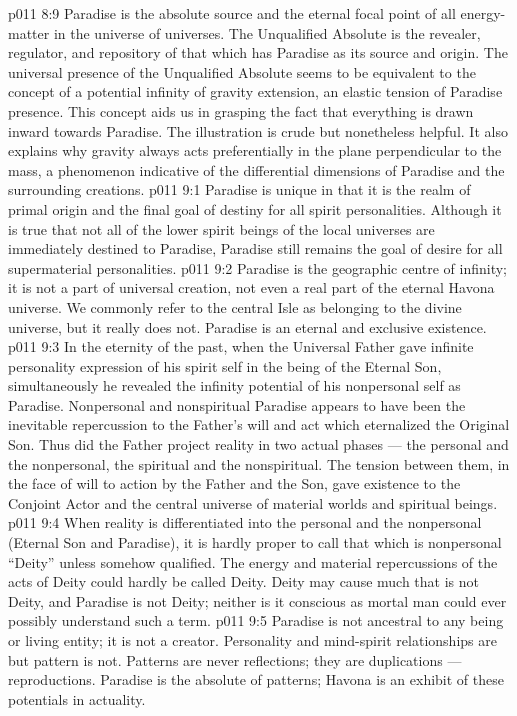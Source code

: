 \vs p011 8:9 Paradise is the absolute source and the eternal focal point of all energy\hyp{}matter in the universe of universes. The Unqualified Absolute is the revealer, regulator, and repository of that which has Paradise as its source and origin. The universal presence of the Unqualified Absolute seems to be equivalent to the concept of a potential infinity of gravity extension, an elastic tension of Paradise presence. This concept aids us in grasping the fact that everything is drawn inward towards Paradise. The illustration is crude but nonetheless helpful. It also explains why gravity always acts preferentially in the plane perpendicular to the mass, a phenomenon indicative of the differential dimensions of Paradise and the surrounding creations.
\vs p011 9:1 Paradise is unique in that it is the realm of primal origin and the final goal of destiny for all spirit personalities. Although it is true that not all of the lower spirit beings of the local universes are immediately destined to Paradise, Paradise still remains the goal of desire for all supermaterial personalities.
\vs p011 9:2 \pc Paradise is the geographic centre of infinity; it is not a part of universal creation, not even a real part of the eternal Havona universe. We commonly refer to the central Isle as belonging to the divine universe, but it really does not. Paradise is an eternal and exclusive existence.
\vs p011 9:3 \pc In the eternity of the past, when the Universal Father gave infinite personality expression of his spirit self in the being of the Eternal Son, simultaneously he revealed the infinity potential of his nonpersonal self as Paradise. Nonpersonal and nonspiritual Paradise appears to have been the inevitable repercussion to the Father’s will and act which eternalized the Original Son. Thus did the Father project reality in two actual phases --- the personal and the nonpersonal, the spiritual and the nonspiritual. The tension between them, in the face of will to action by the Father and the Son, gave existence to the Conjoint Actor and the central universe of material worlds and spiritual beings.
\vs p011 9:4 When reality is differentiated into the personal and the nonpersonal (Eternal Son and Paradise), it is hardly proper to call that which is nonpersonal “Deity” unless somehow qualified. The energy and material repercussions of the acts of Deity could hardly be called Deity. Deity may cause much that is not Deity, and Paradise is not Deity; neither is it conscious as mortal man could ever possibly understand such a term.
\vs p011 9:5 \pc Paradise is not ancestral to any being or living entity; it is not a creator. Personality and mind\hyp{}spirit relationships are  but pattern is not. Patterns are never reflections; they are duplications --- reproductions. Paradise is the absolute of patterns; Havona is an exhibit of these potentials in actuality.
